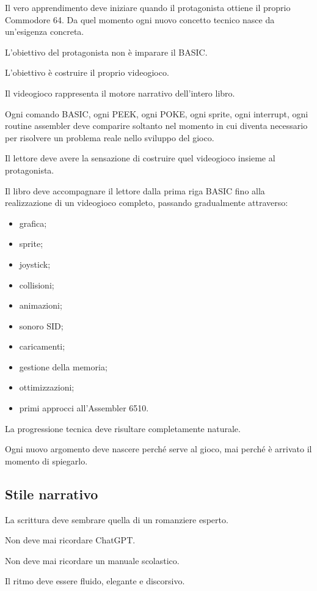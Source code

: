 \documentclass{article}
\begin{document}
Il vero apprendimento deve iniziare quando il protagonista ottiene il proprio Commodore 64. Da quel momento ogni nuovo
concetto tecnico nasce da un'esigenza concreta.

L'obiettivo del protagonista non è imparare il BASIC.

L'obiettivo è costruire il proprio videogioco.

Il videogioco rappresenta il motore narrativo dell'intero libro.

Ogni comando BASIC, ogni PEEK, ogni POKE, ogni sprite, ogni interrupt, ogni routine assembler deve comparire soltanto
nel momento in cui diventa necessario per risolvere un problema reale nello sviluppo del gioco.

Il lettore deve avere la sensazione di costruire quel videogioco insieme al protagonista.

Il libro deve accompagnare il lettore dalla prima riga BASIC fino alla realizzazione di un videogioco completo, passando
gradualmente attraverso:

\begin{itemize}
\item grafica; 
\item sprite; 
\item joystick; 
\item collisioni; 
\item animazioni; 
\item sonoro SID; 
\item caricamenti; 
\item gestione della memoria; 
\item ottimizzazioni; 
\item primi approcci all'Assembler 6510. 
\end{itemize}
La progressione tecnica deve risultare completamente naturale.

Ogni nuovo argomento deve nascere perché serve al gioco, mai perché {\textquotedbl}è arrivato il momento di
spiegarlo{\textquotedbl}.

\subsection{Stile narrativo}
La scrittura deve sembrare quella di un romanziere esperto.

Non deve mai ricordare ChatGPT.

Non deve mai ricordare un manuale scolastico.

Il ritmo deve essere fluido, elegante e discorsivo.
\end{document}
